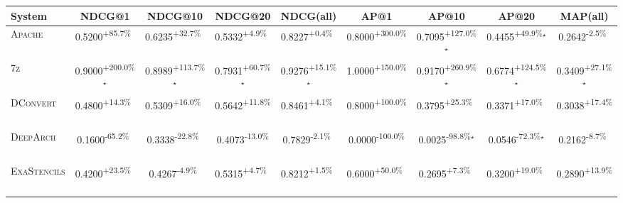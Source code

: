\begin{table}[htbp]
\centering
\renewcommand{\arraystretch}{1.2}
\begin{tabular}{l|cccc|cccc}
\hline
System & NDCG@1 & NDCG@10 & NDCG@20 & NDCG(all) & AP@1 & AP@10 & AP@20 & MAP(all) \\ \hline
\textsc{Apache} & \cellcolor{green!30}0.5200\textsuperscript{+85.7\%}$^{\,\,\,}$ & \cellcolor{green!30}0.6235\textsuperscript{+32.7\%}$^{\,\,\,}$ & \cellcolor{green!30}0.5332\textsuperscript{+4.9\%}$^{\,\,\,}$ & \cellcolor{green!30}0.8227\textsuperscript{+0.4\%}$^{\,\,\,}$ & \cellcolor{green!30}0.8000\textsuperscript{+300.0\%}$^{\,\,\,}$ & \cellcolor{green!30}0.7095\textsuperscript{+127.0\%}$^\star$ & \cellcolor{green!30}0.4455\textsuperscript{+49.9\%}$^\star$ & \cellcolor{red!30}0.2642\textsuperscript{-2.5\%}$^{\,\,\,}$ \\
\textsc{7z} & \cellcolor{green!30}0.9000\textsuperscript{+200.0\%}$^\star$ & \cellcolor{green!30}0.8989\textsuperscript{+113.7\%}$^\star$ & \cellcolor{green!30}0.7931\textsuperscript{+60.7\%}$^\star$ & \cellcolor{green!30}0.9276\textsuperscript{+15.1\%}$^\star$ & \cellcolor{green!30}1.0000\textsuperscript{+150.0\%}$^{\,\,\,}$ & \cellcolor{green!30}0.9170\textsuperscript{+260.9\%}$^\star$ & \cellcolor{green!30}0.6774\textsuperscript{+124.5\%}$^\star$ & \cellcolor{green!30}0.3409\textsuperscript{+27.1\%}$^\star$ \\
\textsc{DConvert} & \cellcolor{green!30}0.4800\textsuperscript{+14.3\%}$^{\,\,\,}$ & \cellcolor{green!30}0.5309\textsuperscript{+16.0\%}$^{\,\,\,}$ & \cellcolor{green!30}0.5642\textsuperscript{+11.8\%}$^{\,\,\,}$ & \cellcolor{green!30}0.8461\textsuperscript{+4.1\%}$^{\,\,\,}$ & \cellcolor{green!30}0.8000\textsuperscript{+100.0\%}$^{\,\,\,}$ & \cellcolor{green!30}0.3795\textsuperscript{+25.3\%}$^{\,\,\,}$ & \cellcolor{green!30}0.3371\textsuperscript{+17.0\%}$^{\,\,\,}$ & \cellcolor{green!30}0.3038\textsuperscript{+17.4\%}$^{\,\,\,}$ \\
\textsc{DeepArch} & \cellcolor{red!30}0.1600\textsuperscript{-65.2\%}$^{\,\,\,}$ & \cellcolor{red!30}0.3338\textsuperscript{-22.8\%}$^{\,\,\,}$ & \cellcolor{red!30}0.4073\textsuperscript{-13.0\%}$^{\,\,\,}$ & \cellcolor{red!30}0.7829\textsuperscript{-2.1\%}$^{\,\,\,}$ & \cellcolor{red!30}0.0000\textsuperscript{-100.0\%}$^{\,\,\,}$ & \cellcolor{red!30}0.0025\textsuperscript{-98.8\%}$^\star$ & \cellcolor{red!30}0.0546\textsuperscript{-72.3\%}$^\star$ & \cellcolor{red!30}0.2162\textsuperscript{-8.7\%}$^{\,\,\,}$ \\
\textsc{ExaStencils} & \cellcolor{green!30}0.4200\textsuperscript{+23.5\%}$^{\,\,\,}$ & \cellcolor{red!30}0.4267\textsuperscript{-4.9\%}$^{\,\,\,}$ & \cellcolor{green!30}0.5315\textsuperscript{+4.7\%}$^{\,\,\,}$ & \cellcolor{green!30}0.8212\textsuperscript{+1.5\%}$^{\,\,\,}$ & \cellcolor{green!30}0.6000\textsuperscript{+50.0\%}$^{\,\,\,}$ & \cellcolor{green!30}0.2695\textsuperscript{+7.3\%}$^{\,\,\,}$ & \cellcolor{green!30}0.3200\textsuperscript{+19.0\%}$^{\,\,\,}$ & \cellcolor{green!30}0.2890\textsuperscript{+13.9\%}$^{\,\,\,}$ \\

\end{tabular}
\end{table}
